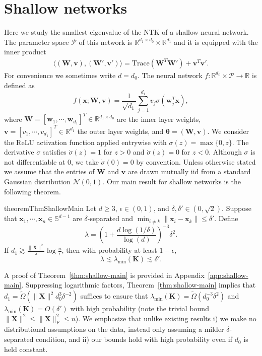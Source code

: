 \documentclass{article}
\theoremstyle{definition}
\newcommand*{\R}{\mathbb{R}}
\newcommand{\mc}{\mathcal}
\renewcommand{\S}{\mathbb{S}}
\def\vtheta{{\bm{\theta}}}
\def\vv{{\bm{v}}}
\def\vw{{\bm{w}}}
\def\vx{{\bm{x}}}
\def\mK{{\bm{K}}}
\def\mW{{\bm{W}}}
\def\mX{{\bm{X}}}
\begin{document}
\section{Shallow networks} \label{section:shallow} 
Here we study the smallest eigenvalue of the NTK of a shallow neural network. The parameter space $\mc{P}$ of this network is $\R^{d_1 \times d_0} \times \R^{d_1}$ and it is equipped with the inner product
\begin{align*}
    \langle (\mW, \vv), (\mW', \vv') \rangle = \text{Trace}(\mW^T \mW') + \vv^T \vv'.
\end{align*}
For convenience we sometimes write $d = d_0$. 
The neural network $f:  \R^{d_0} \times \mc{P}  \rightarrow \R$ is defined as
\begin{equation} \label{eq:shallow-network-map}
f(\vx ; \mW, \vv) = \frac{1}{\sqrt{d_1}} \sum_{j=1}^{d_1} v_j \sigma (\vw_j^T \vx) , 
\end{equation}
where $\mW = [\vw_1, \cdots, \vw_{d_1}]^T \in \R^{d_1 \times d_0}$ 
are the inner layer weights, $\vv = [v_1, \cdots, v_{d_1}]^T\in \mathbb{R}^{d_1}$ the outer layer weights, and $\vtheta = (\mW, \vv)$. 
We consider the ReLU activation function applied entrywise with $\sigma(z) = \max \{0, z \}$.  
The derivative $\dot{\sigma}$ satisfies $\dot{\sigma}(z) = 1$ for $z > 0$ and $\dot{\sigma}(z) = 0$ for $z < 0$. Although $\sigma$ is not differentiable at 0, we take $\dot{\sigma}(0) = 0$ by convention. 
Unless otherwise stated we assume that the entries of $\mW$ and $\vv$ are drawn mutually iid from a standard Gaussian distribution $\mc{N}(0, 1)$. 
Our main result for shallow networks is the following theorem.


\begin{restatable}{theorem}{ThmShallowMain}\label{thm:shallow-main}
Let $d \geq 3$, $\epsilon \in (0,1)$, and $\delta, \delta' \in (0, \sqrt{2})$. Suppose that $\vx_1, \cdots, \vx_n \in \S^{d -1}$ are $\delta$-separated and $\min_{i \neq k}\|\vx_i - \vx_k\| \leq \delta'$. Define
\[
    \lambda = \left( 1 + \frac{d\log(1/\delta)}{\log(d)} \right)^{-3} \delta^2.
\]
If $d_1 \gtrsim \frac{\|\mX\|^2 }{\lambda}\log \frac{n}{\epsilon}$, then with probability at least $1 - \epsilon$, \[\lambda \lesssim \lambda_{\min}(\mK) \lesssim \delta'.\]
\end{restatable}

A proof of Theorem~\ref{thm:shallow-main} is provided in Appendix~\ref{app:shallow-main}. Suppressing logarithmic factors,  Theorem~\ref{thm:shallow-main} implies that $d_1 = \tilde{\Omega}\left(\|\mX\|^2d_0^3\delta^{-2}\right)$ suffices to ensure that $\lambda_{\min}(\mK) = \tilde{\Omega}(d_0^{-3}\delta^2)$ and $\lambda_{\min}(\mK) = O(\delta')$ with high probability (note the trivial bound $\|\mX\|^2\leq\|\mX\|_F^2\leq n$). We emphasize that unlike existing results i) we make no distributional assumptions on the data, instead only assuming a milder $\delta$-separated condition, and ii) our bounds hold with high probability even if $d_0$ is held constant. 
\end{document}
